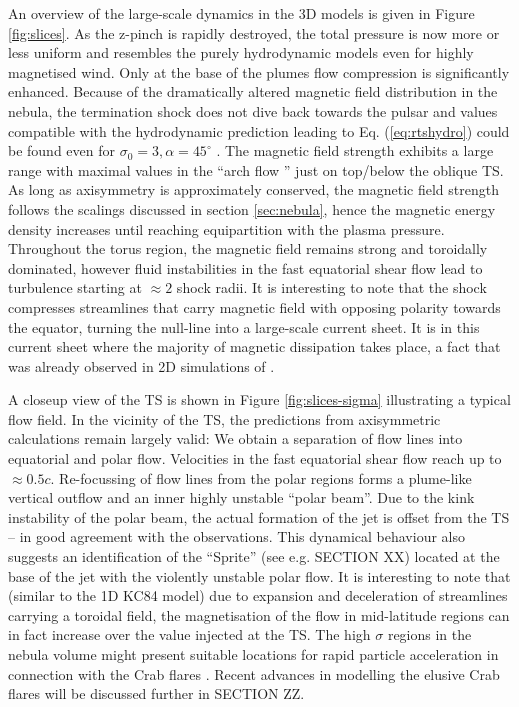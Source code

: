 An overview of the large-scale dynamics in the 3D models is given in Figure \ref{fig:slices}.  As the z-pinch is rapidly destroyed, the total pressure is now more or less uniform and resembles the purely hydrodynamic models even for highly magnetised wind.  
Only at the base of the plumes flow compression is significantly enhanced.  
Because of the dramatically altered magnetic field distribution in the nebula, the termination shock does not dive back towards the pulsar and values compatible with the hydrodynamic prediction leading to Eq. (\ref{eq:rtshydro}) could be found even for $\sigma_0=3,\alpha=45^\circ$ \citep{PorthKomissarov2014a}.  
The magnetic field strength exhibits a large range with maximal values in the ``arch flow '' just on top/below the oblique TS.  As long as axisymmetry is approximately conserved, the magnetic field strength follows the scalings discussed in section \ref{sec:nebula}, hence the magnetic energy density increases until reaching equipartition with the plasma pressure.  Throughout the torus region, the magnetic field remains strong and toroidally dominated, however fluid instabilities in the fast equatorial shear flow lead to turbulence starting at $\approx 2 $ shock radii.  It is interesting to note that the shock compresses streamlines that carry magnetic field with opposing polarity towards the equator, turning the null-line into a large-scale current sheet.  It is in this current sheet where the majority of magnetic dissipation takes place, a fact that was already observed in 2D simulations of \cite{camus2009}.  

A  closeup view of the TS is shown in Figure \ref{fig:slices-sigma} illustrating a typical flow field.  In the vicinity of the TS, the predictions from axisymmetric calculations remain largely valid:  We obtain a separation of flow lines into equatorial and polar flow.  Velocities in the fast equatorial shear flow reach up to $\approx0.5c$.  Re-focussing of flow lines from the polar regions forms a plume-like vertical outflow and an inner highly unstable ``polar beam''.  Due to the kink instability of the polar beam, the actual formation of the jet is offset from the TS -- in good agreement with the observations.  This dynamical behaviour also suggests an identification of the ``Sprite'' (see e.g. SECTION XX) located at the base of the jet  with the violently unstable polar flow.  
It is interesting to note that (similar to the 1D KC84 model) due to expansion and deceleration of streamlines carrying a toroidal field, the magnetisation of the flow in mid-latitude regions can in fact increase over the value injected at the TS.  The high $\sigma$ regions in the nebula volume might present suitable locations for rapid particle acceleration in connection with the Crab flares \citep[e.g.][]{LyutikovSironi2016}.  Recent advances in modelling the elusive Crab flares will be discussed further in SECTION ZZ.  


